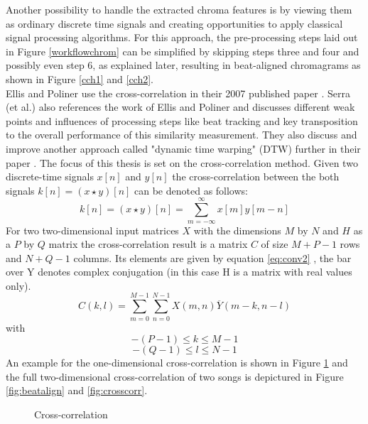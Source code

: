 Another possibility to handle the extracted chroma features is by viewing them as ordinary discrete time signals and creating opportunities to apply classical signal processing algorithms. For this approach, the pre-processing steps laid out in Figure \ref{workflowchrom} can be simplified by skipping steps three and four and possibly even step 6, as explained later, resulting in beat-aligned chromagrams as shown in Figure \ref{cch1} and \ref{cch2}.\\
Ellis and Poliner use the cross-correlation in their 2007 published paper \cite{chroma3}. Serra (et al.) also references the work of Ellis and Poliner and discusses different weak points and influences of processing steps like beat tracking and key transposition to the overall performance of this similarity measurement. 
They also discuss and improve another approach called "dynamic time warping" (DTW) further in their paper \cite{chroma2}. The focus of this thesis is set on the cross-correlation method. 
Given two discrete-time signals $x[n]$ and $y[n]$ the cross-correlation between the both signals $k[n] = (x \star y)[n]$ can be denoted as follows:
\begin{equation} \label{eq:conv1}
k[n] = (x \star y)[n] = \sum_{m = -\infty}^{\infty}{x[m] y[m - n]} 
\end{equation}
For two two-dimensional input matrices $X$ with the dimensions $M$ by $N$ and $H$ as a $P$ by $Q$ matrix the cross-correlation result is a matrix $C$ of size $M + P - 1$ rows and $N + Q - 1$ columns. Its elements are given by equation \ref{eq:conv2} \cite{mathcorr}, the bar over Y denotes complex conjugation (in this case H is a matrix with real values only). 
\begin{equation} \label{eq:conv2}
C(k, l) = \sum_{m = 0}^{M - 1}{\sum_{n = 0}^{N - 1}{X(m, n)\overline{Y}(m - k, n - l)}}
\end{equation}
with 
\begin{equation} \label{eq:conv3}
-(P - 1) \leq k \leq M - 1
\end{equation}
\begin{equation} \label{eq:conv4}
-(Q - 1) \leq l \leq N - 1
\end{equation}
An example for the one-dimensional cross-correlation is shown in Figure \ref{fig:corr1} and the full two-dimensional cross-correlation of two songs is depictured in Figure \ref{fig:beatalign} and \ref{fig:crosscorr}.
\begin{figure}[htbp]
	\centering
	\caption{Cross-correlation}
	\label{fig:corr1}
\end{figure}
